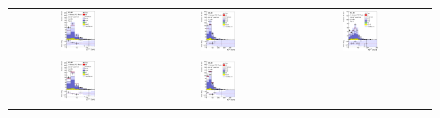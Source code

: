 \begin{figure}[tp]
  \centering
  \begin{tabular}{ccc}
  \includegraphics[width=0.27\textwidth]{Analysis/Figures_ttH/tesis_vars/prefit/lep_pt_5jetex4btagin.eps} &
  \includegraphics[width=0.27\textwidth]{Analysis/Figures_ttH/tesis_vars/prefit/met_5jetex4btagin.eps} &
  \includegraphics[width=0.27\textwidth]{Analysis/Figures_ttH/tesis_vars/prefit/WlepMT_5jetex4btagin.eps} \\
  \includegraphics[width=0.27\textwidth]{Analysis/Figures_ttH/tesis_vars/postfit/lep_pt_5jetex4btagin.eps} &
  \includegraphics[width=0.27\textwidth]{Analysis/Figures_ttH/tesis_vars/postfit/met_5jetex4btagin.eps} &

\end{tabular}
\end{figure}
